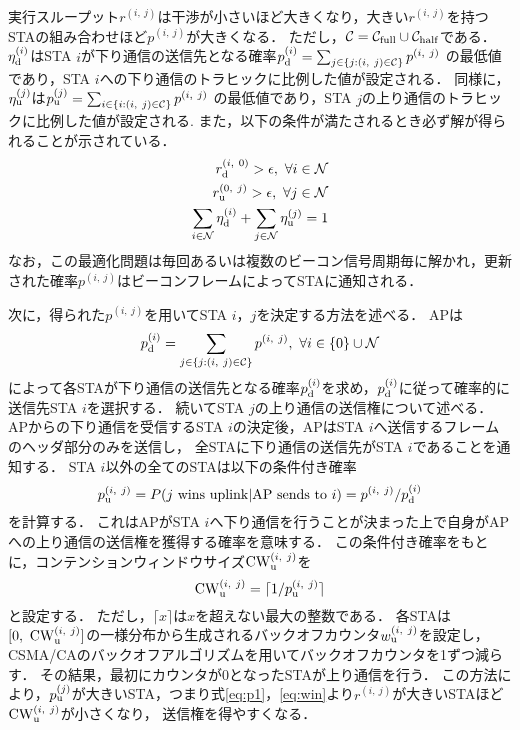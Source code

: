 \documentclass[technicalreport]{ieicej}
\newcommand{\sij}{(i,\ j)}
\newcommand{\mN}{{\mathcal N}}
\newcommand{\pij}{p^{(i,\ j)}}
\newcommand{\rij}{r^{\sij}}
\begin{document}
		実行スループット$\rij$は干渉が小さいほど大きくなり，大きい$\rij$を持つSTAの組み合わせほど$p^{\sij}$が大きくなる．
		ただし，${\mathcal C} = {\mathcal C}_{\rm full} \cup {\mathcal C}_{\rm half}$である．
		$\eta_{\rm d}^{(i)}$はSTA $i$が下り通信の送信先となる確率$p_{\rm d}^{(i)}=\sum_{j\in\{j:(i,\ j)\in{\mathcal C}\}} p^{(i,\ j)}$
		の最低値であり，STA $i$への下り通信のトラヒックに比例した値が設定される．
		同様に，$\eta_{\rm u}^{(j)}$は$p_{\rm u}^{(j)}=\sum_{i\in\{i:(i,\ j)\in{\mathcal C}\}} p^{(i,\ j)}$
		の最低値であり，STA $j$の上り通信のトラヒックに比例した値が設定される.
		また，以下の条件が満たされるとき必ず解が得られることが示されている．
		\begin{align}
			r_{\rm d}^{(i,\ 0)} >\epsilon,\ \forall i\in\mN \\
			r_{\rm u}^{(0,\ j)} >\epsilon,\ \forall j\in\mN \\
			\sum_{i\in\mN}\eta_{\rm d}^{(i)} + \sum_{j\in\mN}\eta_{\rm u}^{(j)} =1 \label{eq:feasible}
		\end{align}
		なお，この最適化問題は毎回あるいは複数のビーコン信号周期毎に解かれ，更新された確率$\pij$はビーコンフレームによってSTAに通知される．
		\par
		次に，得られた$\pij$を用いてSTA $i$，$j$を決定する方法を述べる．
		APは
		\begin{equation}
			p_{\rm d}^{(i)}= \sum_{j\in\{j:(i,\ j)\in{\mathcal C}\}}p^{(i,\ j)},\ \forall i \in \{0\}\cup{\mathcal N}
		\end{equation}
		によって各STAが下り通信の送信先となる確率$p_{\rm d}^{(i)}$を求め，$p_{\rm d}^{(i)}$に従って確率的に送信先STA $i$を選択する．
		続いてSTA $j$の上り通信の送信権について述べる．
		APからの下り通信を受信するSTA $i$の決定後，APはSTA $i$へ送信するフレームのヘッダ部分のみを送信し，
		全STAに下り通信の送信先がSTA $i$であることを通知する．
		STA $i$以外の全てのSTAは以下の条件付き確率
		\begin{equation}
			p_{\rm u}^{\sij} = P(j\ {\rm wins\ uplink|AP\ sends\ to}\ i)=\pij / p_{\rm d}^{(i)} \label{eq:win}
		\end{equation}
		を計算する．
		これはAPがSTA $i$へ下り通信を行うことが決まった上で自身がAPへの上り通信の送信権を獲得する確率を意味する．
		この条件付き確率をもとに，コンテンションウィンドウサイズ${\rm CW}^{\sij}_{\rm u}$を
		\begin{equation}
			{\rm CW}^{\sij}_{\rm u} = \lceil 1/p_{\rm u}^{\sij} \rceil
		\end{equation}
		と設定する．
		ただし，$\lceil x \rceil$は$x$を超えない最大の整数である．
		各STAは$[0,\ {\rm CW}^{\sij}_{\rm u}]$の一様分布から生成されるバックオフカウンタ$w_{\rm u}^{\sij}$を設定し，
		CSMA/CAのバックオフアルゴリズムを用いてバックオフカウンタを1ずつ減らす．
		その結果，最初にカウンタが0となったSTAが上り通信を行う．
		この方法により，$p_{\rm u}^{(j)}$が大きいSTA，つまり式\eqref{eq:p1}，\eqref{eq:win}より$r^{\sij}$が大きいSTAほど${\rm CW}^{\sij}_{\rm u}$が小さくなり，
		送信権を得やすくなる．
\end{document}
